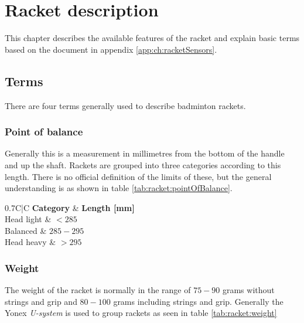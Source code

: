 \chapter{Racket description}
This chapter describes the available features of the racket and explain basic terms based on the document in appendix \ref{app:ch:racketSensors}.

\section{Terms}
There are four terms generally used to describe badminton rackets.

\subsection*{Point of balance}
Generally this is a measurement in millimetres from the bottom of the handle and up the shaft.
Rackets are grouped into three categories according to this length.
There is no official definition of the limits of these, but the general understanding is as shown in table \ref{tab:racket:pointOfBalance}.

\begin{table}
	\begin{center}
		\begin{tabularx}{0.7\textwidth}{C|C}
			\textbf{Category} & \textbf{Length [mm]} \\
			\hline
			Head light        & $< 285$                \\
			Balanced          & $285-295$              \\
			Head heavy        & $>295$                 \\
		\end{tabularx}
	\end{center}
    \caption{Categorization of a racket's point of balance}
    \label{tab:racket:pointOfBalance}
\end{table}

\subsection*{Weight}
The weight of the racket is normally in the range of $75-90$ grams without strings and grip and $80-100$ grams including strings and grip.
Generally the Yonex \textit{U-system} is used to group rackets as seen in table \ref{tab:racket:weight}

